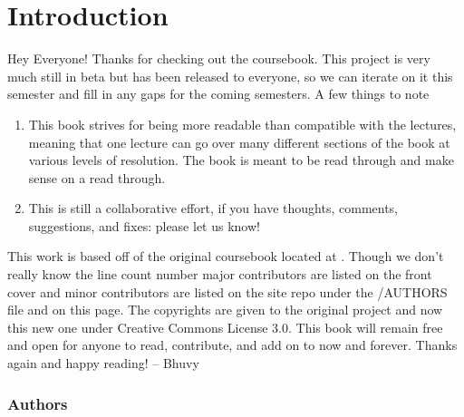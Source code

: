 \chapter{Introduction}

Hey Everyone! Thanks for checking out the coursebook.
This project is very much still in beta but has been released to everyone, so we can iterate on it this semester and fill in any gaps for the coming semesters.
A few things to note

\begin{enumerate}
	\item This book strives for being more readable than compatible with the lectures, meaning that one lecture can go over many different sections of the book at various levels of resolution. The book is meant to be read through and make sense on a read through.
	\item This is still a collaborative effort, if you have thoughts, comments, suggestions, and fixes: please let us know!
\end{enumerate}

This work is based off of the original coursebook located at .
Though we don't really know the line count number major contributors are listed on the front cover and minor contributors are listed on the site repo under the /AUTHORS file and on this page.
The copyrights are given to the original project and now this new one under Creative Commons License 3.0.
This book will remain free and open for anyone to read, contribute, and add on to now and forever.
Thanks again and happy reading!
-- Bhuvy

\subsection{Authors}



